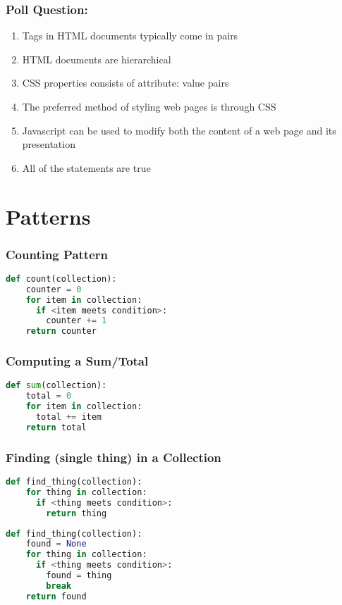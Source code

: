 \documentclass{beamer}
\begin{document}
%
%
\begin{frame}[fragile]
  \frametitle{Poll Question: }
  \vfill
  \begin{enumerate}[A]
    \item Tags in HTML documents typically come in pairs
    \item HTML documents are hierarchical
    \item CSS properties consists of attribute: value pairs
    \item The preferred method of styling web pages is through CSS
    \item Javascript can be used to modify both the content of a web page and its presentation
    \item All of the statements are true
  \end{enumerate}
\end{frame}

\section{Patterns}

%
%
\begin{frame}[fragile]
  \frametitle{Counting Pattern}
  \begin{lstlisting}[language=Python, autogobble]
  def count(collection):
    counter = 0
    for item in collection:
      if <item meets condition>:
        counter += 1
    return counter
  \end{lstlisting}
\end{frame}

%
%
\begin{frame}[fragile]
  \frametitle{Computing a Sum/Total}
  \begin{lstlisting}[language=Python, autogobble]
  def sum(collection):
    total = 0
    for item in collection:
      total += item
    return total
  \end{lstlisting}
\end{frame}

%
%
\begin{frame}[fragile]
  \frametitle{Finding (single thing) in a Collection}
  \begin{lstlisting}[language=Python, autogobble]
  def find_thing(collection):
    for thing in collection:
      if <thing meets condition>:
        return thing
  \end{lstlisting}
  \vfill
  \begin{lstlisting}[language=Python, autogobble]
  def find_thing(collection):
    found = None
    for thing in collection:
      if <thing meets condition>:
        found = thing
        break
    return found
  \end{lstlisting}
\end{frame}
\end{document}
